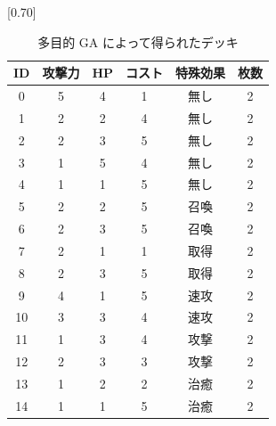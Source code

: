 \documentclass[12pt]{jarticle}
\begin{document}
  \begin{table}[ht]
    \centering
    \caption{多目的 GA によって得られたデッキ}
    \label{table:multigadeck}
    \vspace{-0.3cm}
    \scalebox{0.70}[0.70]{
      \begin{tabular}{|c|c|c|c|c|c|}
        \hline
        ID & 攻撃力 & HP & コスト & 特殊効果 & 枚数 \\ \hline \hline
        0 & 5 & 4 & 1 & 無し & 2 \\ \hline
        1 & 2 & 2 & 4 & 無し & 2 \\ \hline
        2 & 2 & 3 & 5 & 無し & 2 \\ \hline
        3 & 1 & 5 & 4 & 無し & 2 \\ \hline
        4 & 1 & 1 & 5 & 無し & 2 \\ \hline
        5 & 2 & 2 & 5 & 召喚 & 2 \\ \hline
        6 & 2 & 3 & 5 & 召喚 & 2 \\ \hline
        7 & 2 & 1 & 1 & 取得 & 2 \\ \hline
        8 & 2 & 3 & 5 & 取得 & 2 \\ \hline
        9 & 4 & 1 & 5 & 速攻 & 2 \\ \hline
        10 & 3 & 3 & 4 & 速攻 & 2 \\ \hline
        11 & 1 & 3 & 4 & 攻撃 & 2 \\ \hline
        12 & 2 & 3 & 3 & 攻撃 & 2 \\ \hline
        13 & 1 & 2 & 2 & 治癒 & 2 \\ \hline
        14 & 1 & 1 & 5 & 治癒 & 2 \\ \hline
        \end{tabular}
    }
    \end{table}
  
\end{document}

